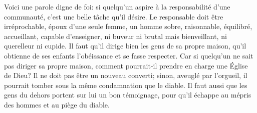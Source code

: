 Voici une parole digne de foi:
	si quelqu’un aspire à la responsabilité d’une communauté,
	c’est une belle tâche qu’il désire.
Le responsable doit être irréprochable, époux d’une seule femme,
	un homme sobre, raisonnable, équilibré, accueillant, capable d’enseigner,
	ni buveur ni brutal mais bienveillant, ni querelleur ni cupide.
Il faut qu’il dirige bien les gens de sa propre maison,
	qu’il obtienne de ses enfants l’obéissance et se fasse respecter.
Car si quelqu’un ne sait pas diriger sa propre maison,
	comment pourrait-il prendre en charge une Église de Dieu?
Il ne doit pas être un nouveau converti;
	sinon, aveuglé par l’orgueil,
		il pourrait tomber sous la même condamnation que le diable.
Il faut aussi que les gens du dehors portent sur lui un bon témoignage,
	pour qu’il échappe au mépris des hommes et au piège du diable.
